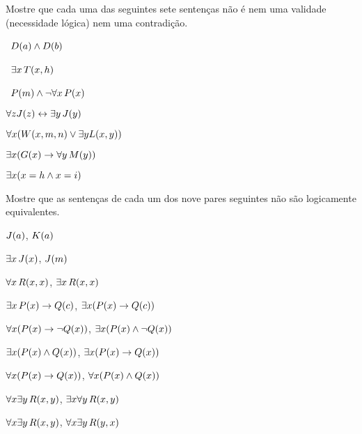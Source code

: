 \solutions
\problempart
\label{pr.Contingent}
Mostre que cada uma das seguintes sete sentenças não é nem uma validade (necessidade lógica) nem uma contradição.
\begin{earg}
\item \leftsolutions\ $\mathord{D}(a)  \wedge \mathord{D}(b)$
\item \leftsolutions\ $\exists x\, \mathord{T}(x,h)$
\item \leftsolutions\ $\mathord{P}(m)  \wedge \neg\forall x\, \mathord{P}(x)$
\item $\forall z \mathord{J}(z) \leftrightarrow \exists y\, \mathord{J}(y)$
\item $\forall x (\mathord{W}(x,m,n) \vee \exists y\mathord{L}(x,y))$
\item $\exists x (\mathord{G}(x) \rightarrow \forall y\, \mathord{M}(y))$
\item $\exists x (x = h \wedge x = i)$
\end{earg}

\solutions
\problempart
\label{pr.NotEquiv}
Mostre que as sentenças de cada um dos nove pares seguintes não são logicamente equivalentes.
\begin{earg}
\item $\mathord{J}(a) $,  $\mathord{K}(a)$
\item $\exists x\, \mathord{J}(x)$,  $\mathord{J}(m)$
\item $\forall x\, \mathord{R}(x,x)$, $\exists x\, \mathord{R}(x,x)$
\item $\exists x\, \mathord{P}(x) \rightarrow \mathord{Q}(c)$, $\exists x (\mathord{P}(x) \rightarrow \mathord{Q}(c))$
\item $\forall x(\mathord{P}(x) \rightarrow \neg \mathord{Q}(x))$, $\exists x(\mathord{P}(x) \wedge \neg \mathord{Q}(x))$
\item $\exists x(\mathord{P}(x) \wedge \mathord{Q}(x))$, $\exists x(\mathord{P}(x) \rightarrow \mathord{Q}(x))$
\item $\forall x(\mathord{P}(x)\rightarrow \mathord{Q}(x))$, $\forall x(\mathord{P}(x) \wedge \mathord{Q}(x))$
\item $\forall x\exists y\, \mathord{R}(x,y)$, $\exists x\forall y\, \mathord{R}(x,y)$
\item $\forall x\exists y\, \mathord{R}(x,y)$, $\forall x\exists y\, \mathord{R}(y,x)$
\end{earg}


